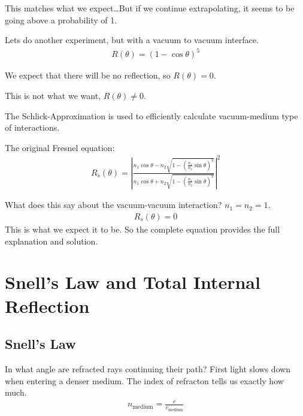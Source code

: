 \documentclass[../pbr.tex]{subfile}
\begin{document}
This matches what we expect\ldots But if we continue extrapolating, it seems
to be going above a probability of 1.

Lets do another experiment, but with a vacuum to vacuum interface.
\begin{align*}
  R(\theta)={\left(1-\cos\theta\right)}^5
\end{align*}

We expect that there will be no reflection, so $R(\theta)=0$.

\begin{Figure}
  \begin{center}
    
  \end{center}
  \label{fig:05_3}
\end{Figure}

This is not what we want, $R(\theta)\neq 0$.

The Schlick-Approximation is used to efficiently calculate vacuum-medium type
of interactions.

The original Fresnel equation:
\begin{align*}
  R_s(\theta)={\left|\frac{n_1\cos\theta-n_2\sqrt{1-{\left(\frac{n_1}{n_2}\sin\theta\right)}^2}}{n_1\cos\theta+n_2\sqrt{1-{\left(\frac{n_1}{n_2}\sin\theta\right)}^2}}\right|}^2
\end{align*}

What does this say about the vacuum-vacuum interaction?
$n_1=n_2=1$.
\begin{align*}
  R_s(\theta)=0
\end{align*}
This is what we expect it to be. So the complete equation provides the
full explanation and solution.

\section{Snell's Law and Total Internal Reflection}%
\label{sec:snell_s_law_and_total_internal_reflection}

\subsection{Snell's Law}%
\label{sub:snell_s_law}

In what angle are refracted rays continuing their path? First light slows
down when entering a denser medium. The index of refracton tells us exactly
how much.
\begin{align*}
  n_\text{medium}=\frac{c}{v_\text{medium}}
\end{align*}
\end{document}
